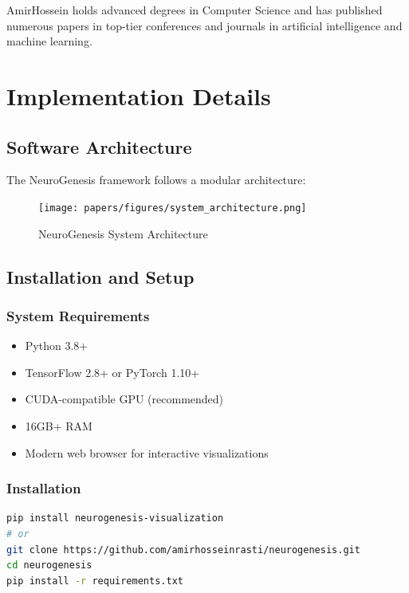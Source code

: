\documentclass[12pt,a4paper]{article}
\begin{document}
AmirHossein holds advanced degrees in Computer Science and has published numerous papers in top-tier conferences and journals in artificial intelligence and machine learning.




\appendix

\section{Implementation Details}
\label{app:implementation}

\subsection{Software Architecture}

The NeuroGenesis framework follows a modular architecture:

\begin{figure}[H]
\centering
\texttt{[image: papers/figures/system\_architecture.png]}
\caption{NeuroGenesis System Architecture}
\label{fig:system-architecture}
\end{figure}

\subsection{Installation and Setup}

\subsubsection{System Requirements}

\begin{itemize}
    \item Python 3.8+
    \item TensorFlow 2.8+ or PyTorch 1.10+
    \item CUDA-compatible GPU (recommended)
    \item 16GB+ RAM
    \item Modern web browser for interactive visualizations
\end{itemize}

\subsubsection{Installation}

\begin{lstlisting}[language=bash]
pip install neurogenesis-visualization
# or
git clone https://github.com/amirhosseinrasti/neurogenesis.git
cd neurogenesis
pip install -r requirements.txt
\end{lstlisting}
\end{document}
